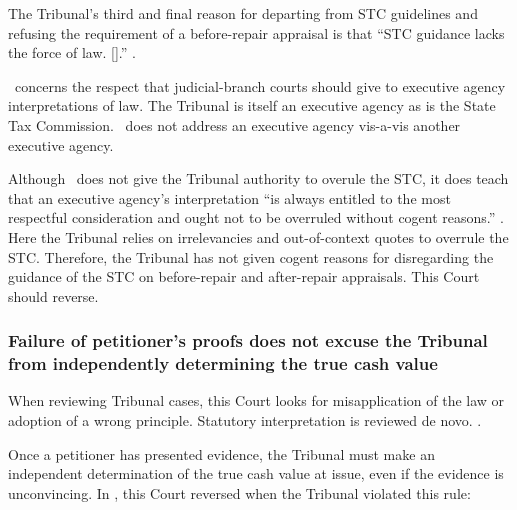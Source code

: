 \documentclass[12pt,\documentclassflag]{michiganCourtOfAppealsBrief}
\begin{document}
The Tribunal's third and final reason for departing from STC guidelines and refusing the requirement of a before-repair appraisal is that ``STC guidance lacks the force of law. [].'' \reconsiderationDenied[2].

\cite[s]{Rovas}\ concerns the respect that judicial-branch courts should give to executive agency interpretations of law. The Tribunal is itself an executive agency as is the State Tax Commission. \cite[s]{Rovas}\ does not address an executive agency vis-a-vis another executive agency.

Although \cite[s]{Rovas}\ does not give the Tribunal authority to overule the STC, it does teach that an executive agency's interpretation ``is always entitled to the most respectful consideration and ought not to be overruled without cogent reasons.'' . Here the Tribunal relies on irrelevancies and out-of-context quotes to overrule the STC.
Therefore, the Tribunal has not given cogent reasons for disregarding the guidance of the STC on before-repair and after-repair appraisals. This Court should reverse. 


\subsubsection{Failure of petitioner's proofs does not excuse the Tribunal from independently determining the true cash value}

When reviewing Tribunal cases, this Court looks for misapplication of the law or adoption of a wrong principle. Statutory interpretation is reviewed de novo. . 

Once a petitioner has presented evidence, the Tribunal must make an independent determination of the true cash value at issue, even if the evidence is unconvincing. In \cite{Jones & Laughlin}, this Court reversed when the Tribunal violated this rule:
\end{document}
